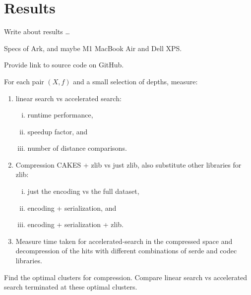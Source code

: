 \section{Results}
\label{sec:results}

Write about results \dots

Specs of Ark, and maybe M1 MacBook Air and Dell XPS.

Provide link to source code on GitHub.

For each pair $(X, f)$ and a small selection of depths, measure:
\begin{enumerate}[1.]
    \item linear search vs accelerated search:
    \begin{enumerate}[i.]
        \item runtime performance,
        \item speedup factor, and
        \item number of distance comparisons.
    \end{enumerate}
    \item Compression CAKES + zlib vs just zlib, also substitute other libraries for zlib:
    \begin{enumerate}[i.]
        \item just the encoding vs the full dataset,
        \item encoding + serialization, and
        \item encoding + serialization + zlib.
    \end{enumerate}
    \item Measure time taken for accelerated-search in the compressed space and decompression of the hits with different combinations of serde and codec libraries.
\end{enumerate}

Find the optimal clusters for compression.
Compare linear search vs accelerated search terminated at these optimal clusters.
